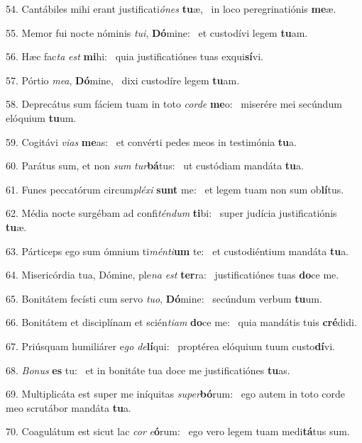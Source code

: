 54. Cantábiles mihi erant justificati\textit{ó}\textit{nes} \textbf{tu}æ, \ast\  in loco peregrinatiónis \textbf{me}æ.\

55. Memor fui nocte nóminis \textit{tu}\textit{i}, \textbf{Dó}mine: \ast\  et custodívi legem \textbf{tu}am.\

56. Hæc fac\textit{ta} \textit{est} \textbf{mi}hi: \ast\  quia justificatiónes tuas exqui\textbf{sí}vi.\

57. Pórtio \textit{me}\textit{a}, \textbf{Dó}mine, \ast\  dixi custodíre legem \textbf{tu}am.\

58. Deprecátus sum fáciem tuam in toto \textit{cor}\textit{de} \textbf{me}o: \ast\  miserére mei secúndum elóquium \textbf{tu}um.\

59. Cogitávi \textit{vi}\textit{as} \textbf{me}as: \ast\  et convérti pedes meos in testimónia \textbf{tu}a.\

60. Parátus sum, et non \textit{sum} \textit{tur}\textbf{bá}tus: \ast\  ut custódiam mandáta \textbf{tu}a.\

61. Funes peccatórum circum\textit{plé}\textit{xi} \textbf{sunt} me: \ast\  et legem tuam non sum ob\textbf{lí}tus.\

62. Média nocte surgébam ad confi\textit{tén}\textit{dum} \textbf{ti}bi: \ast\  super judícia justificatiónis \textbf{tu}æ.\

63. Párticeps ego sum ómnium ti\textit{mén}\textit{ti}\textbf{um} te: \ast\  et custodiéntium mandáta \textbf{tu}a.\

64. Misericórdia tua, Dómine, ple\textit{na} \textit{est} \textbf{ter}ra: \ast\  justificatiónes tuas \textbf{do}ce me.\

65. Bonitátem fecísti cum servo \textit{tu}\textit{o}, \textbf{Dó}mine: \ast\  secúndum verbum \textbf{tu}um.\

66. Bonitátem et disciplínam et scién\textit{ti}\textit{am} \textbf{do}ce me: \ast\  quia mandátis tuis \textbf{cré}didi.\

67. Priúsquam humiliárer e\textit{go} \textit{de}\textbf{lí}qui: \ast\  proptérea elóquium tuum custo\textbf{dí}vi.\

68. \textit{Bo}\textit{nus} \textbf{es} tu: \ast\  et in bonitáte tua doce me justificatiónes \textbf{tu}as.\

69. Multiplicáta est super me iníquitas \textit{su}\textit{per}\textbf{bó}rum: \ast\  ego autem in toto corde meo scrutábor mandáta \textbf{tu}a.\

70. Coagulátum est sicut lac \textit{cor} \textit{e}\textbf{ó}rum: \ast\  ego vero legem tuam medi\textbf{tá}tus sum.\

